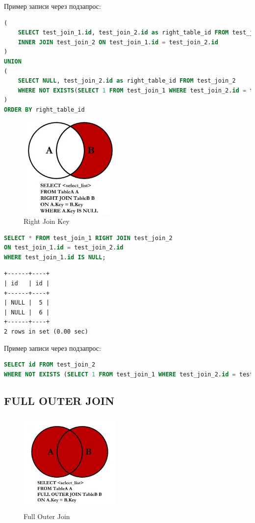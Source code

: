 \documentclass[12pt,a4paper]{article}
\begin{document}
Пример записи через подзапрос:

\begin{lstlisting}[language=SQL]
(
    SELECT test_join_1.id, test_join_2.id as right_table_id FROM test_join_1
	INNER JOIN test_join_2 ON test_join_1.id = test_join_2.id
)
UNION
(
	SELECT NULL, test_join_2.id as right_table_id FROM test_join_2
    WHERE NOT EXISTS(SELECT 1 FROM test_join_1 WHERE test_join_2.id = test_join_1.id)
)
ORDER BY right_table_id
\end{lstlisting}

\begin{figure}[!ht]
    \includegraphics[width=5cm,height=5cm]{images/Lab5/right_join_key.jpg}
    \caption{Right Join Key}
    \label{fig:RightJoinKey}
\end{figure}

\begin{lstlisting}[language=SQL]
SELECT * FROM test_join_1 RIGHT JOIN test_join_2 
ON test_join_1.id = test_join_2.id
WHERE test_join_1.id IS NULL;
\end{lstlisting}

\begin{lstlisting}[basicstyle = \tiny\ttfamily, columns = fixed]
+------+----+
| id   | id |
+------+----+
| NULL |  5 |
| NULL |  6 |
+------+----+
2 rows in set (0.00 sec)
\end{lstlisting}


Пример записи через подзапрос:
\begin{lstlisting}[language=SQL]
SELECT id FROM test_join_2
WHERE NOT EXISTS (SELECT 1 FROM test_join_1 WHERE test_join_2.id = test_join_1.id)
\end{lstlisting}

\subsection{FULL OUTER JOIN}

\begin{figure}[!ht]
    \includegraphics[width=5cm,height=5cm]{images/Lab5/full_outer_join.jpg}
    \caption{Full Outer Join}
    \label{fig:FullOuterJoin}
\end{figure}
\end{document}
